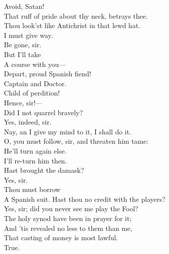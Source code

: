 \documentclass[a4paper,oneside,12pt]{memoir}
\begin{document}
\begin{drama*}
\persecutionspeaks {} Avoid, Satan!\\
That ruff of pride about thy neck, betrays thee.\\
Thou look'st like Antichrist in that lewd hat.\\
\surlyspeaks I must give way.\\
\kastrilspeaks {} Be gone, sir.\\
\surlyspeaks {} But I'll take\\
A course with you---\\
\persecutionspeaks {} Depart, proud Spanish fiend!\\
\surlyspeaks Captain and Doctor.\\
\persecutionspeaks {} Child of perdition!\\
\kastrilspeaks Hence, sir!---\\
 Did I not quarrel bravely?\\
\facespeaks {} Yes, indeed, sir.\\
\kastrilspeaks Nay, an I give my mind to it, I shall do it.\\
\facespeaks O, you must follow, sir, and threaten him tame:\\
He'll turn again else.\\
\kastrilspeaks {} I'll re-turn him then.\\
\facespeaks Hast brought the damask?\\
\druggerspeaks {} Yes, sir.\\
\facespeaks {} Thou must borrow\\
A Spanish suit. Hast thou no credit with the players?\\
\druggerspeaks Yes, sir; did you never see me play the Fool?\\
\persecutionspeaks The holy synod have been in prayer for it;\\
And 'tis revealed no less to them than me,\\
That casting of money is most lawful.\\
\subtlespeaks {} True.\\

\end{drama*}
\end{document}
